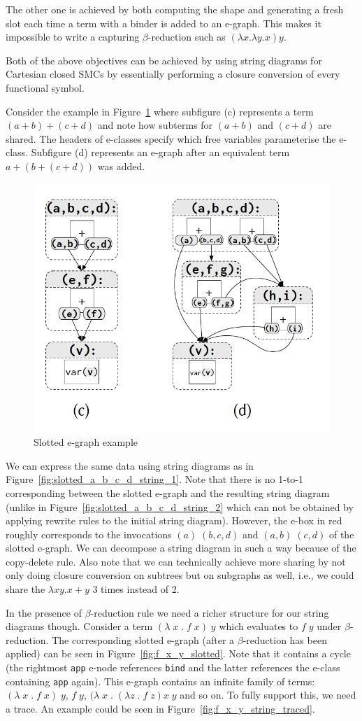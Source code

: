 \documentclass[acmsmall,screen, nonacm, anonymous]{acmart}
\begin{document}
The other one is achieved by both computing the shape and generating a fresh slot each time a term with a binder is added to an e-graph.
This makes it impossible to write a capturing $\beta$-reduction such as $(\lambda x . \lambda y . x) y$.

Both of the above objectives can be achieved by using string diagrams for Cartesian closed SMCs by essentially performing a closure conversion of every functional symbol.

Consider the example in Figure~\ref{fig:slotted_a_b_c_d} where subfigure (c) represents a term $(a + b) + (c + d)$ and note how subterms for $(a+b)$ and $(c + d)$ are shared.
The headers of e-classes specify which free variables parameterise the e-class.
Subfigure (d) represents an e-graph after an equivalent term $a + (b + (c + d))$ was added.

\begin{figure}
  \includegraphics[width=0.5\linewidth]{figures/slotted_a_b_c_d_example}
  \caption{Slotted e-graph example~\cite{slotted-egraphs}}
  \label{fig:slotted_a_b_c_d}
\end{figure}

We can express the same data using string diagrams as in Figure~\ref{fig:slotted_a_b_c_d_string_1}.
Note that there is no 1-to-1 corresponding between the slotted e-graph and the resulting string diagram (unlike in Figure~\ref{fig:slotted_a_b_c_d_string_2} which can not be obtained by applying rewrite rules to the initial string diagram).
However, the e-box in red roughly corresponds to the invocations $(a)\;(b,c,d)$ and $(a,b)\;(c,d)$ of the slotted e-graph.
We can decompose a string diagram in such a way because of the copy-delete rule.
Also note that we can technically achieve more sharing by not only doing closure conversion on subtrees but on subgraphs as well, i.e., we could share the $\lambda x y . x + y$ 3 times instead of 2.

In the presence of $\beta$-reduction rule we need a richer structure for our string diagrams though.
Consider a term $(\lambda\; x\; .\; f\;x)\; y$ which evaluates to $f \; y$ under $\beta$-reduction.
The corresponding slotted e-graph (after a $\beta$-reduction has been applied) can be seen in Figure~\ref{fig:f_x_y_slotted}.
Note that it contains a cycle (the rightmost \texttt{app} e-node references \texttt{bind} and the latter references the e-class containing \texttt{app} again).
This e-graph contains an infinite family of terms: $(\lambda\; x\; .\; f\;x)\; y$, $f \; y$, $(\lambda\; x\; .\; (\lambda z\; .\; f\;z) x\; y$ and so on.
To fully support this, we need a trace.
An example could be seen in Figure~\ref{fig:f_x_y_string_traced}.
\end{document}
